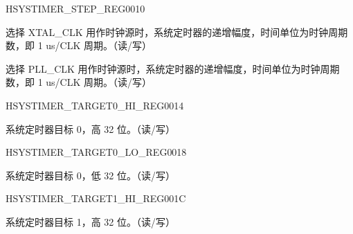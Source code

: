 \begin{register}{H}{SYSTIMER\_STEP\_REG}{\hexprefix{}0010}\label{regdesc:SYSTIMERSTEPREG}
%
%
%
\regnewline%
\begin{regdesc}\begin{reglist}
\label{fielddesc:SYSTIMERTIMERXTALSTEP}\item [SYSTIMER\_TIMER\_XTAL\_STEP] 选择 XTAL\_CLK 用作时钟源时，系统定时器的递增幅度，时间单位为时钟周期数，即 1 us/CLK 周期。（读/写）
\label{fielddesc:SYSTIMERTIMERPLLSTEP}\item [SYSTIMER\_TIMER\_PLL\_STEP] 选择 PLL\_CLK 用作时钟源时，系统定时器的递增幅度，时间单位为时钟周期数，即 1 us/CLK 周期。（读/写）
\end{reglist}\end{regdesc}
\end{register}

\begin{register}{H}{SYSTIMER\_TARGET0\_HI\_REG}{\hexprefix{}0014}\label{regdesc:SYSTIMERTARGET0HIREG}
%
\regnewline%
\begin{regdesc}\begin{reglist}
\label{fielddesc:SYSTIMERTIMERTARGET0HI}\item [SYSTIMER\_TIMER\_TARGET0\_HI] 系统定时器目标 0，高 32 位。（读/写）
\end{reglist}\end{regdesc}
\end{register}


\begin{register}{H}{SYSTIMER\_TARGET0\_LO\_REG}{\hexprefix{}0018}\label{regdesc:SYSTIMERTARGET0LOREG}
%
\regnewline%
\begin{regdesc}\begin{reglist}
\label{fielddesc:SYSTIMERTIMERTARGET0LO}\item [SYSTIMER\_TIMER\_TARGET0\_LO] 系统定时器目标 0，低 32 位。（读/写）
\end{reglist}\end{regdesc}
\end{register}


\begin{register}{H}{SYSTIMER\_TARGET1\_HI\_REG}{\hexprefix{}001C}\label{regdesc:SYSTIMERTARGET1HIREG}
%
\regnewline%
\begin{regdesc}\begin{reglist}
\label{fielddesc:SYSTIMERTIMERTARGET1HI}\item [SYSTIMER\_TIMER\_TARGET1\_HI] 系统定时器目标 1，高 32 位。（读/写）
\end{reglist}\end{regdesc}
\end{register}


